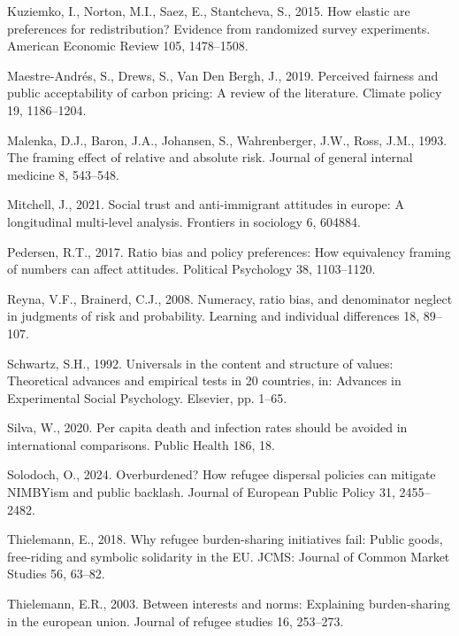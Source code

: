 \documentclass[
  12pt,
  a4paper,
]{article}
\newlength{\cslhangindent}
\newenvironment{CSLReferences}[2] %
 {\begin{list}{}{%
  \setlength{\itemindent}{0pt}
  \setlength{\leftmargin}{0pt}
  \setlength{\parsep}{0pt}
  \ifodd #1
   \setlength{\leftmargin}{\cslhangindent}
   \setlength{\itemindent}{-1\cslhangindent}
  \fi
  \setlength{\itemsep}{#2\baselineskip}}}
 {\end{list}}
\begin{document}
\begin{CSLReferences}{1}{0}
Kuziemko, I., Norton, M.I., Saez, E., Stantcheva, S., 2015. How elastic are preferences for redistribution? Evidence from randomized survey experiments. American Economic Review 105, 1478--1508.

Maestre-Andrés, S., Drews, S., Van Den Bergh, J., 2019. Perceived fairness and public acceptability of carbon pricing: A review of the literature. Climate policy 19, 1186--1204.

Malenka, D.J., Baron, J.A., Johansen, S., Wahrenberger, J.W., Ross, J.M., 1993. The framing effect of relative and absolute risk. Journal of general internal medicine 8, 543--548.

Mitchell, J., 2021. Social trust and anti-immigrant attitudes in europe: A longitudinal multi-level analysis. Frontiers in sociology 6, 604884.

Pedersen, R.T., 2017. Ratio bias and policy preferences: How equivalency framing of numbers can affect attitudes. Political Psychology 38, 1103--1120.

Reyna, V.F., Brainerd, C.J., 2008. Numeracy, ratio bias, and denominator neglect in judgments of risk and probability. Learning and individual differences 18, 89--107.

Schwartz, S.H., 1992. Universals in the content and structure of values: Theoretical advances and empirical tests in 20 countries, in: Advances in Experimental Social Psychology. Elsevier, pp. 1--65.

Silva, W., 2020. Per capita death and infection rates should be avoided in international comparisons. Public Health 186, 18.

Solodoch, O., 2024. Overburdened? How refugee dispersal policies can mitigate NIMBYism and public backlash. Journal of European Public Policy 31, 2455--2482.

Thielemann, E., 2018. Why refugee burden-sharing initiatives fail: Public goods, free-riding and symbolic solidarity in the EU. JCMS: Journal of Common Market Studies 56, 63--82.

Thielemann, E.R., 2003. Between interests and norms: Explaining burden-sharing in the european union. Journal of refugee studies 16, 253--273.


\end{CSLReferences}
\end{document}
